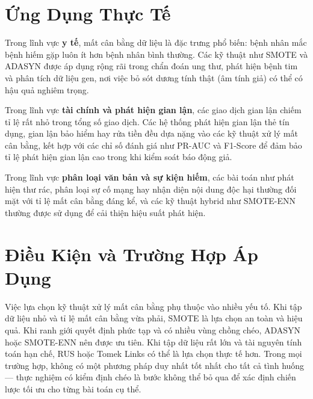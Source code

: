\section{Ứng Dụng Thực Tế}

Trong lĩnh vực \textbf{y tế}, mất cân bằng dữ liệu là đặc trưng phổ biến: bệnh nhân mắc bệnh hiếm gặp luôn ít hơn bệnh nhân bình thường. Các kỹ thuật như SMOTE và ADASYN được áp dụng rộng rãi trong chẩn đoán ung thư, phát hiện bệnh tim và phân tích dữ liệu gen, nơi việc bỏ sót dương tính thật (âm tính giả) có thể có hậu quả nghiêm trọng.

Trong lĩnh vực \textbf{tài chính và phát hiện gian lận}, các giao dịch gian lận chiếm tỉ lệ rất nhỏ trong tổng số giao dịch. Các hệ thống phát hiện gian lận thẻ tín dụng, gian lận bảo hiểm hay rửa tiền đều dựa nặng vào các kỹ thuật xử lý mất cân bằng, kết hợp với các chỉ số đánh giá như PR-AUC và F1-Score để đảm bảo tỉ lệ phát hiện gian lận cao trong khi kiểm soát báo động giả.

Trong lĩnh vực \textbf{phân loại văn bản và sự kiện hiếm}, các bài toán như phát hiện thư rác, phân loại sự cố mạng hay nhận diện nội dung độc hại thường đối mặt với tỉ lệ mất cân bằng đáng kể, và các kỹ thuật hybrid như SMOTE-ENN thường được sử dụng để cải thiện hiệu suất phát hiện.

\section{Điều Kiện và Trường Hợp Áp Dụng}

Việc lựa chọn kỹ thuật xử lý mất cân bằng phụ thuộc vào nhiều yếu tố. Khi tập dữ liệu nhỏ và tỉ lệ mất cân bằng vừa phải, SMOTE là lựa chọn an toàn và hiệu quả. Khi ranh giới quyết định phức tạp và có nhiều vùng chồng chéo, ADASYN hoặc SMOTE-ENN nên được ưu tiên. Khi tập dữ liệu rất lớn và tài nguyên tính toán hạn chế, RUS hoặc Tomek Links có thể là lựa chọn thực tế hơn. Trong mọi trường hợp, không có một phương pháp duy nhất tốt nhất cho tất cả tình huống --- thực nghiệm có kiểm định chéo là bước không thể bỏ qua để xác định chiến lược tối ưu cho từng bài toán cụ thể.

